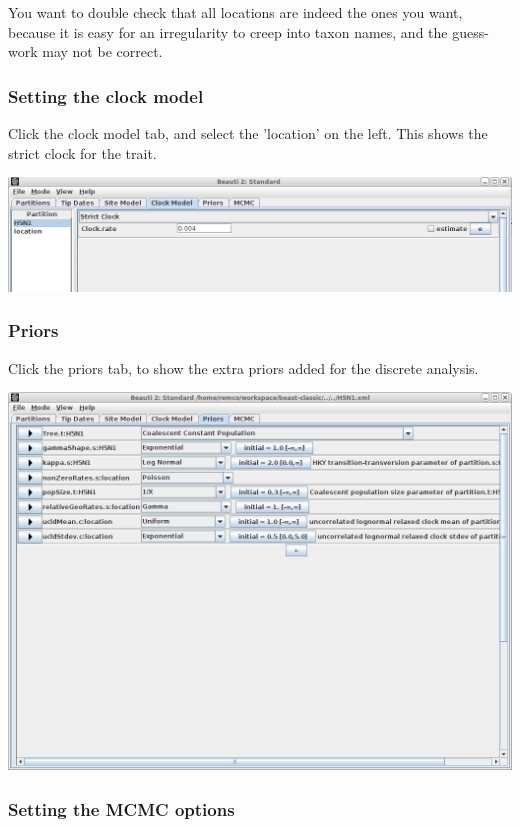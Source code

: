 \documentclass{article}
\begin{document}
You want to double check that all locations are indeed the ones you want, because it is easy for an irregularity to creep into taxon names, and the guess-work may not be correct.


\subsubsection*{Setting the clock model}

Click the clock model tab, and select the 'location' on the left.
This shows the strict clock for the trait.

\includegraphics[scale=0.4]{figures/BEAUti_clockmodel2.png}

\subsubsection*{Priors}

Click the priors tab, to show the extra priors added for the discrete analysis.

\includegraphics[scale=0.4]{figures/BEAUti_priors2.png}

\subsubsection*{Setting the MCMC options }
\end{document}

